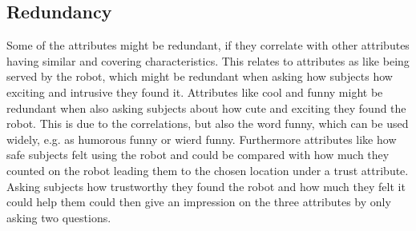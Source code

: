\subsection{Redundancy}
%
Some of the attributes might be redundant, if they correlate with other attributes having similar and covering characteristics. This relates to attributes as like being served by the robot, which might be redundant when asking how subjects how exciting and intrusive they found it. Attributes like cool and funny might be redundant when also asking subjects about how cute and exciting they found the robot. This is due to the correlations, but also the word funny, which can be used widely, e.g. as humorous funny or wierd funny. Furthermore attributes like how safe subjects felt using the robot and could be compared with how much they counted on the robot leading them to the chosen location under a trust attribute. Asking subjects how trustworthy they found the robot and how much they felt it could help them could then give an impression on the three attributes by only asking two questions.